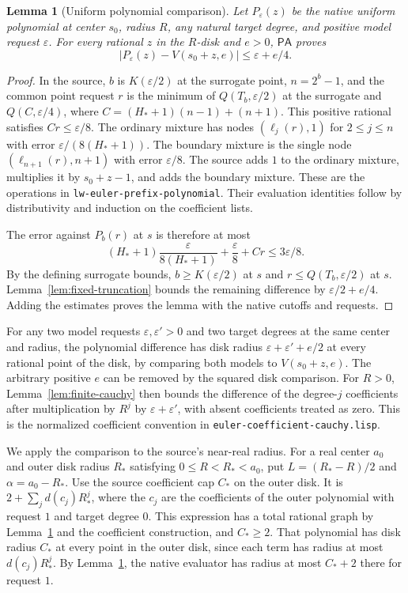 \documentclass[11pt]{amsart}
\newtheorem{lemma}[theorem]{Lemma}
\theoremstyle{definition}
\theoremstyle{remark}
\numberwithin{equation}{section}
\newcommand{\PA}{\mathsf{PA}}
\newcommand{\code}[1]{\nolinkurl{#1}}
\begin{document}
\begin{lemma}[Uniform polynomial comparison]\label{lem:native-poly}
Let $P_\varepsilon(z)$ be the native uniform polynomial at
center $s_0$, radius $R$, any natural target degree, and
positive model request $\varepsilon$. For every rational
$z$ in the $R$-disk and $e>0$, $\PA$ proves
\[
      |P_\varepsilon(z)-V(s_0+z,e)|\le\varepsilon+e/4 .
\]
\end{lemma}
\begin{proof}
In the source, $b$ is $K(\varepsilon/2)$ at the surrogate
point, $n=2^b-1$, and the common point request $r$ is the
minimum of $Q(T_b,\varepsilon/2)$ at the surrogate and
$Q(C,\varepsilon/4)$, where
$C=(H_*+1)(n-1)+(n+1)$. This positive rational satisfies
$Cr\le\varepsilon/8$. The ordinary mixture has nodes
$(\ell_j(r),1)$ for $2\le j\le n$ with error
$\varepsilon/(8(H_*+1))$. The boundary mixture is the
single node $(\ell_{n+1}(r),n+1)$ with error $\varepsilon/8$.
The source adds $1$ to the ordinary mixture, multiplies
it by $s_0+z-1$, and adds the boundary mixture. These
are the operations in \code{lw-euler-prefix-polynomial}.
Their evaluation identities follow by distributivity and
induction on the coefficient lists.

The error against $P_b(r)$ at $s$ is therefore at most
\[
 (H_*+1)\frac{\varepsilon}{8(H_*+1)}
          +\frac{\varepsilon}{8}+Cr\le3\varepsilon/8 .
\]
By the defining surrogate bounds, $b\ge K(\varepsilon/2)$
at $s$ and $r\le Q(T_b,\varepsilon/2)$ at $s$.
Lemma~\ref{lem:fixed-truncation} bounds the remaining
difference by $\varepsilon/2+e/4$. Adding the estimates
proves the lemma with the native cutoffs and requests.
\end{proof}

For any two model requests $\varepsilon,\varepsilon'>0$
and two target degrees at the same center and radius,
the polynomial difference has disk radius
$\varepsilon+\varepsilon'+e/2$ at every rational point of
the disk, by comparing both models to $V(s_0+z,e)$.
The arbitrary positive $e$ can be removed by the squared
disk comparison. For $R>0$, Lemma~\ref{lem:finite-cauchy}
then bounds the difference of the degree-$j$ coefficients
after multiplication by $R^j$ by $\varepsilon+\varepsilon'$,
with absent coefficients treated as zero. This is the
normalized coefficient convention in
\code{euler-coefficient-cauchy.lisp}.

We apply the comparison to the source's near-real radius.
For a real center $a_0$ and outer disk radius $R_*$ satisfying
$0\le R<R_*<a_0$, put $L=(R_*-R)/2$ and $\alpha=a_0-R_*$.
Use the source coefficient cap $C_*$ on the outer disk.
It is $2+\sum_j d(c_j)R_*^j$, where the $c_j$ are the
coefficients of the outer polynomial with request $1$ and
target degree $0$. This expression has a total rational
graph by Lemma~\ref{lem:native-poly} and the coefficient
construction, and $C_*\ge2$. That polynomial has disk
radius $C_*$ at every point in the outer disk, since
each term has radius at most $d(c_j)R_*^j$.
By Lemma~\ref{lem:native-poly}, the native evaluator
has radius at most $C_*+2$ there for request $1$.
\end{document}
